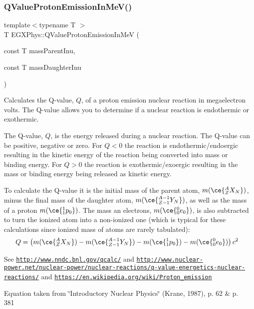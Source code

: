\subsubsection{\texorpdfstring{Q\+Value\+Proton\+Emission\+In\+Me\+V()}{QValueProtonEmissionInMeV()}}
{\footnotesize\ttfamily template$<$typename T $>$ \\
T E\+G\+X\+Phys\+::\+Q\+Value\+Proton\+Emission\+In\+MeV (\begin{DoxyParamCaption}\item[{const T}]{mass\+Parent\+Inu,  }\item[{const T}]{mass\+Daughter\+Inu }\end{DoxyParamCaption})}



Calculates the Q-\/value, $Q$, of a proton emission nuclear reaction in megaelectron volts. The Q-\/value allows you to determine if a nuclear reaction is endothermic or exothermic. 

The Q-\/value, $Q$, is the energy released during a nuclear reaction. The Q-\/value can be positive, negative or zero. For $Q < 0$ the reaction is endothermic/endoergic resulting in the kinetic energy of the reaction being converted into mass or binding energy. For $Q > 0$ the reaction is exothermic/exoergic resulting in the mass or binding energy being released as kinetic energy.

To calculate the Q-\/value it is the initial mass of the parent atom, $m(\ce{ ^{A}_{Z}X_{N} })$, minus the final mass of the daughter atom, $m(\ce{ ^{A-1}_{Z-1}Y_{N} })$, as well as the mass of a proton $m(\ce{ ^{1}_{1}p_{0} })$. The mass an electrons, $m(\ce{ ^{0}_{0}e_{0} })$, is also subtracted to turn the ionized atom into a non-\/ionized one (which is typical for these calculations since ionized mass of atoms are rarely tabulated)\+: \[Q = \left ( m(\ce{ ^{A}_{Z}X_{N} })-m(\ce{ ^{A-1}_{Z-1}Y_{N} })-m(\ce{ ^{1}_{1}p_{0} })-m(\ce{ ^{0}_{0}e_{0} }) \right) c^2\]

See \href{http://www.nndc.bnl.gov/qcalc/}{\tt http\+://www.\+nndc.\+bnl.\+gov/qcalc/} and \href{http://www.nuclear-power.net/nuclear-power/nuclear-reactions/q-value-energetics-nuclear-reactions/}{\tt http\+://www.\+nuclear-\/power.\+net/nuclear-\/power/nuclear-\/reactions/q-\/value-\/energetics-\/nuclear-\/reactions/} and \href{https://en.wikipedia.org/wiki/Proton_emission}{\tt https\+://en.\+wikipedia.\+org/wiki/\+Proton\+\_\+emission}

Equation taken from \char`\"{}\+Introductory Nuclear Physics\char`\"{} (Krane, 1987), p. 62 \& p. 381


